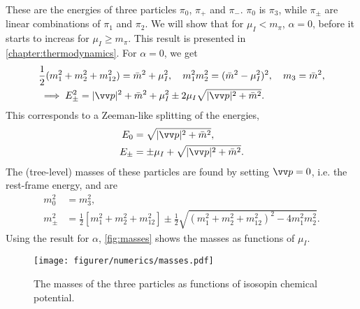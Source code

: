 These are the energies of three particles $\pi_0$, $\pi_+$ and $\pi_-$.
$\pi_0$ is $\pi_3$, while $\pi_\pm$ are linear combinations of $\pi_1$ and $\pi_2$.
We will show that for $\mu_I < m_\pi$, $\alpha = 0$, before it starts to increas for $\mu_I \geq m_\pi$.
This result is presented in \autoref{chapter:thermodynamics}.
For $\alpha = 0$, we get
\begin{align*}
    &\frac{1}{2}(m_1^2 + m_2^2 + m_{12}^2) 
    =
    \bar m^2 + \mu_I^2, \quad
    m_1^2 m_2^2 = (\bar m^2 - \mu_I^2)^2, \quad
    m_3 = \bar m^2, \\
    &\implies E_\pm^2 = |\vv p|^2 + \bar m^2 + \mu_I^2 \pm 2 \mu_I \sqrt{|\vv p|^2 + \bar m^2}.
\end{align*}
This corresponds to a Zeeman-like splitting of the energies,
\begin{align}
    E_0 & = \sqrt{|\vv p |^2 + \bar m^2}, \\
    E_\pm &= \pm \mu_I + \sqrt{|\vv p |^2 + \bar m^2}.
\end{align}
The (tree-level) masses of these particles are found by setting $\vv p = 0$, i.e. the rest-frame energy, and are
\begin{align}
    m_0^2 &= m_3^2, \\
    m_\pm^2
    & =  \frac{1}{2}
    \left[
        m_1^2 + m_2^2 + m_{12}^2 
    \right]
    \pm \frac{1}{2}
    \sqrt{
        \left(
            m_1^2 + m_2^2 + m_{12}^2
        \right)^2
        - 4 m_1^2 m_2^2
    }.
\end{align}
Using the result for $\alpha$, \autoref{fig:masses} shows the masses as functions of $\mu_I$.

\begin{figure}[h]
    \centering
    \texttt{[image: figurer/numerics/masses.pdf]}
    \caption{The masses of the three particles as functions of isosopin chemical potential.}
    \label{fig:masses}
\end{figure}

